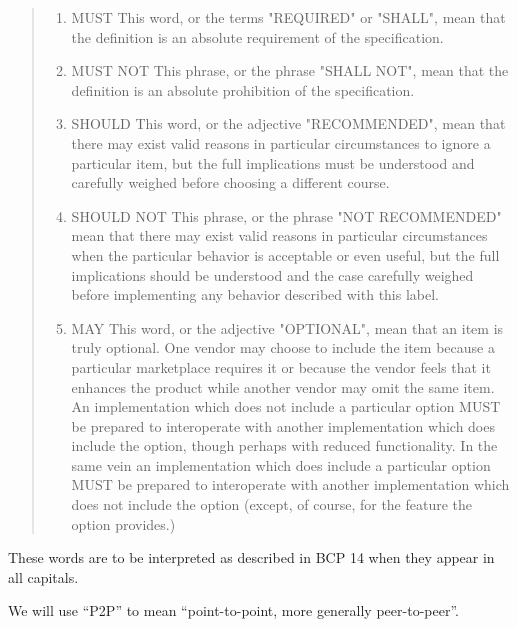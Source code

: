 \blockquote[]{
    \begin{enumerate}
        \item MUST   This word, or the terms "REQUIRED" or "SHALL", mean that 
            the definition is an absolute requirement of the specification.

        \item MUST NOT   This phrase, or the phrase "SHALL NOT", mean that the
            definition is an absolute prohibition of the specification.

        \item SHOULD   This word, or the adjective "RECOMMENDED", mean that 
            there may exist valid reasons in particular circumstances to ignore 
            a particular item, but the full implications must be understood and 
            carefully weighed before choosing a different course.

        \item SHOULD NOT   This phrase, or the phrase "NOT RECOMMENDED" mean 
            that there may exist valid reasons in particular circumstances when 
            the particular behavior is acceptable or even useful, but the full 
            implications should be understood and the case carefully weighed  
            before implementing any behavior described with this label.

        \item MAY   This word, or the adjective "OPTIONAL", mean that an item is
        truly optional.  One vendor may choose to include the item because a
        particular marketplace requires it or because the vendor feels that
        it enhances the product while another vendor may omit the same item.
        An implementation which does not include a particular option MUST be
        prepared to interoperate with another implementation which does
        include the option, though perhaps with reduced functionality. In the
        same vein an implementation which does include a particular option
        MUST be prepared to interoperate with another implementation which
        does not include the option (except, of course, for the feature the
        option provides.)
    \end{enumerate}
}

These words are to be interpreted as described in BCP 14 \cite{rfc8174} when
they appear in all capitals.

We will use \enquote{P2P} to mean \enquote{point-to-point, more generally
peer-to-peer}.